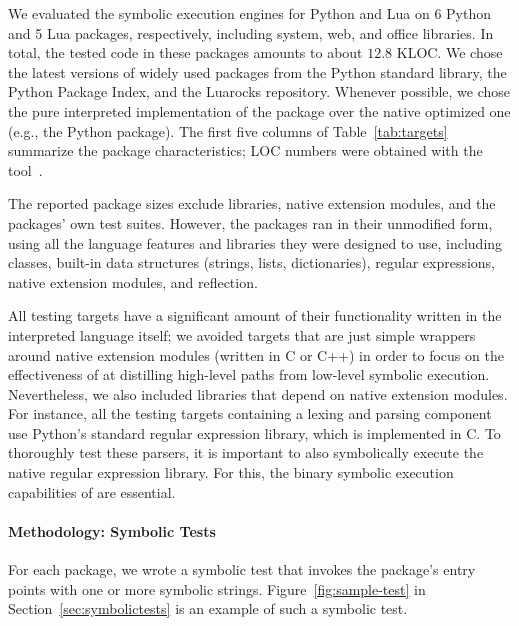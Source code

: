 We evaluated the symbolic execution engines for Python and Lua on 6 Python and 5 Lua packages, respectively, including system, web, and office libraries. In total, the tested code in these packages amounts to about $12.8$ KLOC.  We chose the latest versions of widely used packages from the Python standard library, the Python Package Index, and the Luarocks repository.  Whenever possible, we chose the pure interpreted implementation of the package over the native optimized one (e.g., the Python  package). The first five columns of Table~\ref{tab:targets} summarize the package characteristics; LOC numbers were obtained with the  tool~\cite{cloc}.

The reported package sizes exclude libraries, native extension modules, and the packages' own test suites.
However, the packages ran in their unmodified form, using all the language features and libraries they were designed to use, including classes, built-in data structures (strings, lists, dictionaries), regular expressions, native extension modules, and reflection.  

All testing targets have a significant amount of their functionality written in the interpreted language itself; we avoided targets that are just simple wrappers around native extension modules (written in C or C++) in order to focus on the effectiveness of \chef at distilling high-level paths from low-level symbolic execution.  Nevertheless, we also included libraries that depend on native extension modules.  For instance, all the testing targets containing a lexing and parsing component use Python's standard regular expression library, which is implemented in C.
To thoroughly test these parsers, it is important to also symbolically execute the native regular expression library. For this, the binary symbolic execution capabilities of \chef are essential.

\paragraph{Methodology: Symbolic Tests}

For each package, we wrote a symbolic test that invokes the package's entry points with one or more symbolic strings.  
Figure~\ref{fig:sample-test} in Section~\ref{sec:symbolictests} is an example of such a symbolic test.


